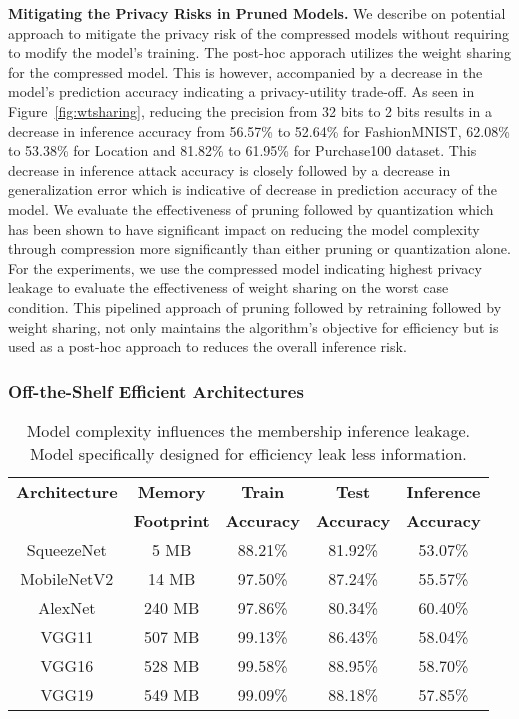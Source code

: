 \textbf{Mitigating the Privacy Risks in Pruned Models.} We describe on potential approach to mitigate the privacy risk of the compressed models without requiring to modify the model's training.
The post-hoc apporach utilizes the weight sharing for the compressed model. This is however, accompanied by a decrease in the model's prediction accuracy indicating a privacy-utility trade-off.
As seen in Figure~\ref{fig:wtsharing}, reducing the precision from 32 bits to 2 bits results in a decrease in inference accuracy from 56.57\% to 52.64\% for FashionMNIST, 62.08\% to 53.38\% for Location and 81.82\% to 61.95\% for Purchase100 dataset.
This decrease in inference attack accuracy is closely followed by a decrease in generalization error which is indicative of decrease in prediction accuracy of the model.
We evaluate the effectiveness of pruning followed by quantization which has been shown to have significant impact on reducing the model complexity through compression more significantly than either pruning or quantization alone.
For the experiments, we use the compressed model indicating highest privacy leakage to evaluate the effectiveness of weight sharing on the worst case condition.
This pipelined approach of pruning followed by retraining followed by weight sharing, not only maintains the algorithm's objective for efficiency but is used as a post-hoc approach to reduces the overall inference risk.






\subsubsection{Off-the-Shelf Efficient Architectures}


\begin{table}[!htb]
\begin{center}
\renewcommand\arraystretch{1.5}
\fontsize{6.7pt}{6.7pt}\selectfont
\begin{tabular}{|c|c|c|c|c|}
\hline
\textbf{Architecture} & \textbf{Memory} & \textbf{Train}  & \textbf{Test}  & \textbf{Inference}   \\
 & \textbf{Footprint} & \textbf{Accuracy} & \textbf{Accuracy} & \textbf{Accuracy}  \\
\hline
SqueezeNet & 5 MB & 88.21\% & 81.92\% & \cellcolor{green!25}53.07\% \\
MobileNetV2 & 14 MB & 97.50\% & 87.24\% & \cellcolor{green!25}55.57\% \\
\hline
AlexNet & 240 MB & 97.86\% & 80.34\% & \cellcolor{red!25}60.40\% \\
VGG11 & 507 MB & 99.13\% & 86.43\% & \cellcolor{red!25}58.04\% \\
VGG16 & 528 MB & 99.58\% & 88.95\% & \cellcolor{red!25}58.70\%  \\
VGG19 & 549 MB & 99.09\% & 88.18\% & \cellcolor{red!25}57.85\% \\
\hline
\end{tabular}
\end{center}
\caption{Model complexity influences the membership inference leakage. Model specifically designed for efficiency leak less information.}
\label{stdarch}
\end{table}

